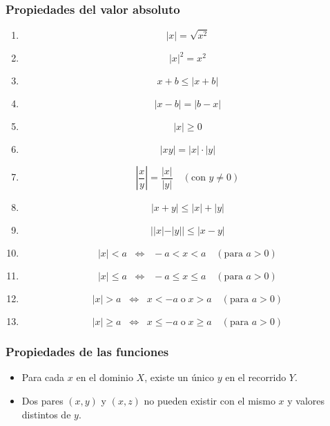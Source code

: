 \subsubsection*{Propiedades del valor absoluto}

\begin{multicols}{2}
\begin{enumerate}[label=(\arabic*)]
    \item
    \[
        |x| = \sqrt{x^2}
    \]

    \item
    \[
        |x|^2 = x^2
    \]

    \item
    \[
        x + b \leq |x + b|
    \]

    \item
    \[
        |x - b| = |b - x|
    \]

    \item
    \[
        |x| \geq 0
    \]

    \item
    \[
        |xy| = |x|\cdot|y|
    \]

    \item
    \[
        \left|\frac{x}{y}\right| = \frac{|x|}{|y|} 
        \quad (\text{con } y \neq 0)
    \]

    \item
    \[
        |x + y| \leq |x| + |y|
    \]

    \item
    \[
        ||x| - |y|| \leq |x - y|
    \]

    \item
    \[
        |x| < a 
        \;\;\Leftrightarrow\;\; -a < x < a 
        \quad (\text{para } a > 0)
    \]

    \item
    \[
        |x| \leq a 
        \;\;\Leftrightarrow\;\; -a \leq x \leq a 
        \quad (\text{para } a > 0)
    \]

    \item
    \[
        |x| > a 
        \;\;\Leftrightarrow\;\; x < -a \;\text{o}\; x > a 
        \quad (\text{para } a > 0)
    \]

    \item
    \[
        |x| \geq a 
        \;\;\Leftrightarrow\;\; x \leq -a \;\text{o}\; x \geq a 
        \quad (\text{para } a > 0)
    \]
\end{enumerate}
\end{multicols}

\subsubsection*{Propiedades de las funciones}
\begin{itemize}
    \item Para cada $x$ en el dominio $X$, existe un único $y$ en el recorrido $Y$.
    \item Dos pares $(x, y)$ y $(x, z)$ no pueden existir con el mismo $x$ y valores distintos de $y$.
\end{itemize}

